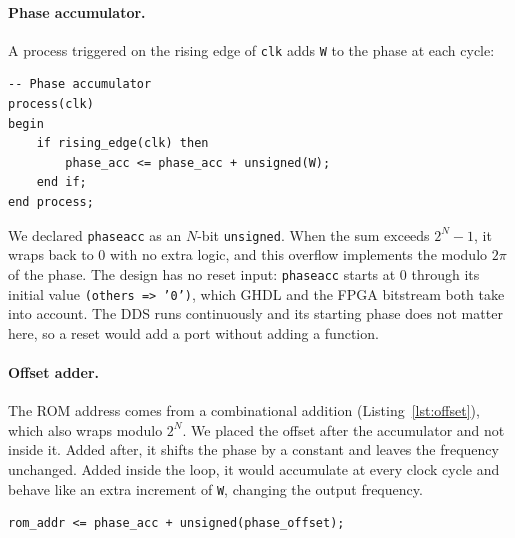 \documentclass[11pt,a4paper]{article}
\renewcommand{\_}{\oldunderscore\allowbreak}
\begin{document}
\paragraph{Phase accumulator.} A process triggered on the rising edge of
\texttt{clk} adds \texttt{W} to the phase at each cycle:

\begin{lstlisting}[style=vhdl, caption={Phase accumulator}]
-- Phase accumulator
process(clk)
begin
    if rising_edge(clk) then
        phase_acc <= phase_acc + unsigned(W);
    end if;
end process;
\end{lstlisting}

We declared \texttt{phase\_acc} as an $N$-bit \texttt{unsigned}. When the sum
exceeds $2^N-1$, it wraps back to 0 with no extra logic, and this overflow
implements the modulo $2\pi$ of the phase. The design has no reset input:
\texttt{phase\_acc} starts at 0 through its initial value
\texttt{(others => '0')}, which GHDL and the FPGA bitstream both take into
account. The DDS runs continuously and its starting phase does not matter here,
so a reset would add a port without adding a function.

\paragraph{Offset adder.} The ROM address comes from a combinational addition
(Listing~\ref{lst:offset}), which also wraps modulo $2^N$. We placed the offset after the accumulator and not inside it.
Added after, it shifts the phase by a constant and leaves the frequency
unchanged. Added inside the loop, it would accumulate at every clock cycle and
behave like an extra increment of \texttt{W}, changing the output frequency.
\begin{lstlisting}[style=vhdl, caption={Offset adder}, label={lst:offset}]
rom_addr <= phase_acc + unsigned(phase_offset);
\end{lstlisting}
\end{document}
